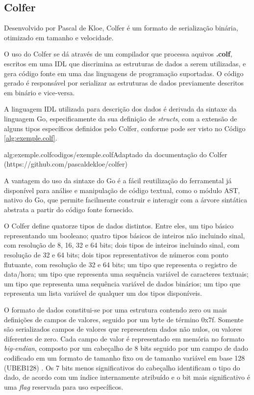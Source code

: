 \subsection{Colfer}

Desenvolvido por Pascal de Kloe, Colfer é um formato de serialização binária, otimizado em tamanho e velocidade.

O uso do Colfer se dá através de um compilador que processa aquivos \textbf{.colf}, escritos em uma IDL que discrimina as estruturas de dados a serem utilizadas,
e gera código fonte em uma das linguagens de programação suportadas. O código gerado é responsável por serializar as estruturas de dados previamente descritos em binário e vice-versa.

A linguagem IDL utilizada para descrição dos dados é derivada da sintaxe da linguagem Go, especificamente da sua definição de \textit{structs}, com a extensão de alguns tipos específicos definidos pelo Colfer, conforme pode ser visto no Código \ref{alg:exemple.colf}.

 {alg:exemple.colf}{codigos/exemple.colf}{Adaptado da documentação do Colfer (https://github.com/pascaldekloe/colfer)}

A vantagem do uso da sintaxe do Go é a fácil reutilização do ferramental já disponível para análise e manipulação de código textual, como o módulo AST, nativo do Go, que permite facilmente construir e interagir com a árvore sintática abstrata a partir do código fonte fornecido.

O Colfer define quatorze tipos de dados distintos. Entre eles, um tipo básico representando um booleano; quatro tipos básicos de inteiros não incluindo sinal, com resolução de 8, 16, 32 e 64 bits;
dois tipos de inteiros incluindo sinal, com resolução de 32 e 64 bits; dois tipos representativos de números com ponto flutuante, com resolução de 32 e 64 bits; 
um tipo que representa o registro de data/hora; um tipo que representa uma sequência variável de caracteres textuais; um tipo que representa uma sequência variável de dados binários; um tipo que representa um lista variável de qualquer um dos tipos disponíveis.

O formato de dados constitui-se por uma estrutura contendo zero ou mais definições de campos de valores, seguido por um byte de término 0x7f.
Somente são serializados campos de valores que representem dados não nulos, ou valores diferentes de zero.
Cada campo de valor é representado em memória no formato \textit{big-endian}, composto por um cabeçalho de 8 bits seguido por um campo de dado codificado em um formato de tamanho fixo ou de tamanho variável em base 128 (UBEB128) \cite{wang2017experimental}. 
Os 7 bits menos significativos do cabeçalho identificam o tipo do dado, de acordo com um índice internamente atribuído e o bit mais significativo é uma \textit{flag} reservada para uso específicos.

